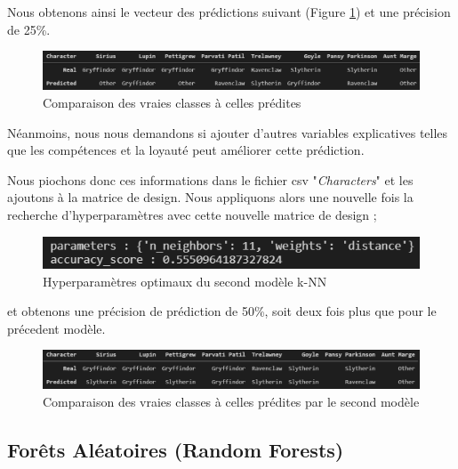 \documentclass[11pt]{article}
\begin{document}
\begin{center}
Nous obtenons ainsi le vecteur des prédictions suivant (Figure \ref{res_knn1}) et une précision de 25\%. 
\begin{figure}[hbt!]
    \centering
    \includegraphics[width = 14 cm]{./figures/output_knn1.png}
    \caption{Comparaison des vraies classes à celles prédites}
    \label{res_knn1}
\end{figure}
\FloatBarrier

Néanmoins, nous nous demandons si ajouter d'autres variables explicatives telles que les compétences et la loyauté peut améliorer cette prédiction.\par

Nous piochons donc ces informations dans le fichier csv "\textit{Characters}" et les ajoutons à la matrice de design.
Nous appliquons alors une nouvelle fois la recherche d'hyperparamètres avec cette nouvelle matrice de design ;

\begin{figure}[hbt!]
    \centering
    \includegraphics[width = 12 cm]{./figures/kNN_grid2.png}
    \caption{Hyperparamètres optimaux du second modèle k-NN}
    \label{param_knn2}
\end{figure}
\FloatBarrier

et obtenons une précision de prédiction de 50\%, soit deux fois plus que pour le précedent modèle.

\begin{figure}[hbt!]
    \centering
    \includegraphics[width = 14 cm]{./figures/output_knn2.png}
    \caption{Comparaison des vraies classes à celles prédites par le second modèle}
    \label{res_knn2}
\end{figure}

\subsection{Forêts Aléatoires (Random Forests)}


\end{center}
\end{document}
